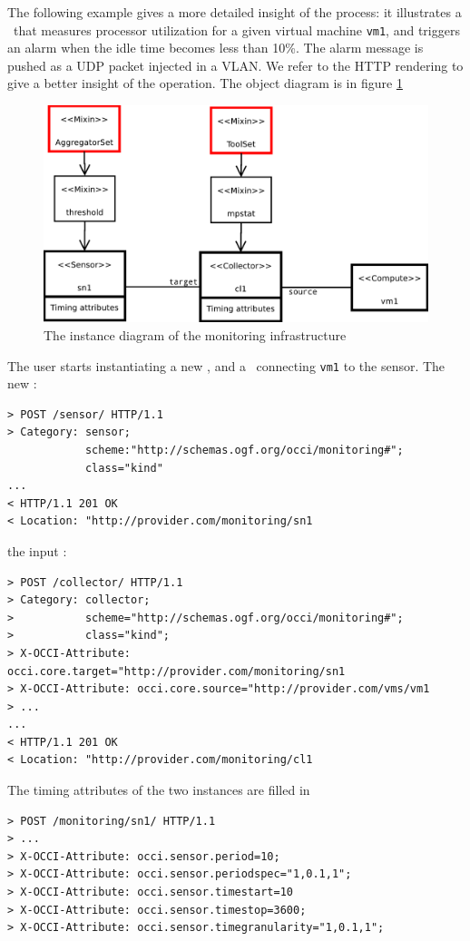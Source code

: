 \documentclass[12pt]{article}  %
\begin{document}
The following example gives a more detailed insight of the process: it illustrates a \sens\ that measures processor utilization for a given virtual machine {\tt vm1}, and triggers an alarm when the idle time becomes less than 10\%. The alarm message is pushed as a UDP packet injected in a VLAN. We refer to the HTTP rendering to give a better insight of the operation. The object diagram is in figure \ref  {fig:example}

\begin{figure}
\centering
\includegraphics[width=0.7 \linewidth]{Diagram.pdf}
\caption{The instance diagram of the monitoring infrastructure \label{fig:example}}
\end{figure}

The user starts instantiating a new \sens, and a \coll\ connecting {\tt vm1} to the sensor. The new \sens:

\begin{verbatim}
> POST /sensor/ HTTP/1.1
> Category: sensor; 
            scheme:"http://schemas.ogf.org/occi/monitoring#"; 
            class="kind"
...
< HTTP/1.1 201 OK
< Location: "http://provider.com/monitoring/sn1
\end{verbatim}

the input \coll:

\begin{verbatim}
> POST /collector/ HTTP/1.1
> Category: collector;
>           scheme="http://schemas.ogf.org/occi/monitoring#";
>           class="kind";
> X-OCCI-Attribute: occi.core.target="http://provider.com/monitoring/sn1
> X-OCCI-Attribute: occi.core.source="http://provider.com/vms/vm1
> ...
...
< HTTP/1.1 201 OK
< Location: "http://provider.com/monitoring/cl1
\end{verbatim}

The timing attributes of the two instances are filled in

\begin{verbatim}
> POST /monitoring/sn1/ HTTP/1.1
> ...
> X-OCCI-Attribute: occi.sensor.period=10;
> X-OCCI-Attribute: occi.sensor.periodspec="1,0.1,1";
> X-OCCI-Attribute: occi.sensor.timestart=10
> X-OCCI-Attribute: occi.sensor.timestop=3600;
> X-OCCI-Attribute: occi.sensor.timegranularity="1,0.1,1";
\end{verbatim}
\end{document}
